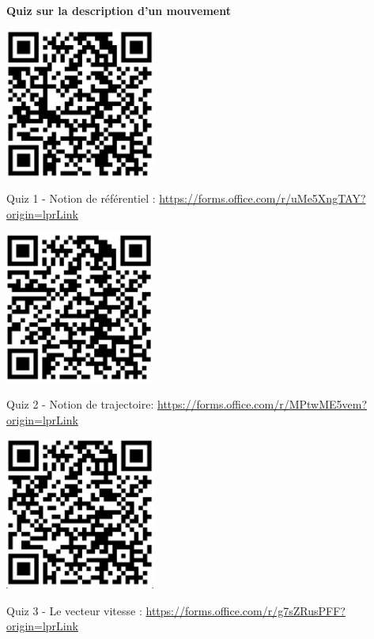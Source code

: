 \documentclass[french, a4paper, 12pt, twocolumn, landscape]{article}
\begin{document}
	\noindent \textbf{Quiz sur la description d'un mouvement}
\begin{center}
	\begin{minipage}{.14\textwidth}
		\centering
		\includegraphics[width=.5\textwidth]{Quiz1.png}
		
		Quiz 1 - Notion de référentiel : \url{https://forms.office.com/r/uMe5XngTAY?origin=lprLink}
	\end{minipage}\hspace{.5cm}
	\begin{minipage}{.14\textwidth}
		\centering
		\includegraphics[width=.5\textwidth]{Quiz2.png}

		Quiz 2 - Notion de trajectoire: \url{https://forms.office.com/r/MPtwME5vem?origin=lprLink}
	\end{minipage}\hspace{.5cm}
\begin{minipage}{.14\textwidth}
			\centering
			\includegraphics[width=.5\textwidth]{Quiz3.png}
	
			Quiz 3 - Le vecteur vitesse : \url{https://forms.office.com/r/g7sZRusPFF?origin=lprLink}
		\end{minipage}
\end{center}
\end{document}
